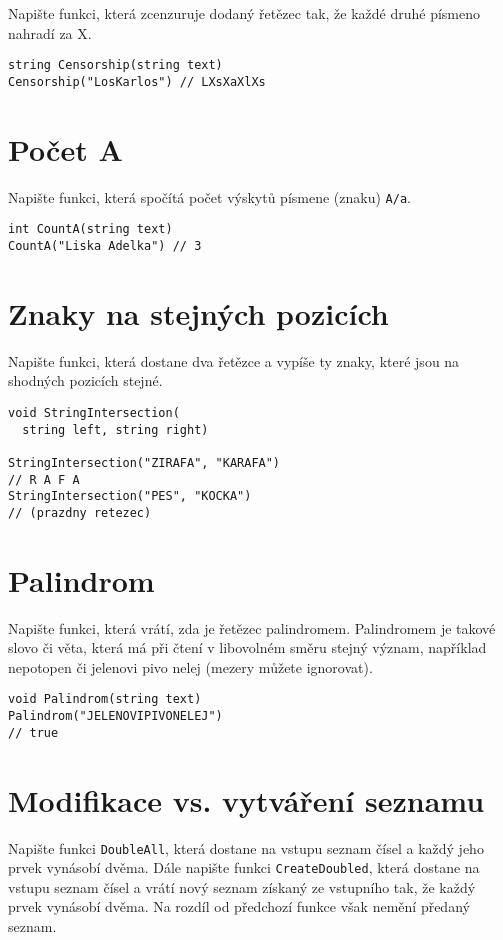 \documentclass[12pt,a4paper]{article}
\begin{document}
\begin{multicols}{2}
Napište funkci, která zcenzuruje dodaný řetězec tak, že každé druhé písmeno nahradí za X.

\begin{verbatim}
string Censorship(string text)
Censorship("LosKarlos") // LXsXaXlXs
\end{verbatim}

\section{Počet A}

Napište funkci, která spočítá počet výskytů písmene (znaku) \texttt{A/a}.

\begin{verbatim}
int CountA(string text)
CountA("Liska Adelka") // 3
\end{verbatim}

\section{Znaky na stejných pozicích}

Napište funkci, která dostane dva řetězce a vypíše ty znaky, které jsou na
shodných pozicích stejné.

\begin{verbatim}
void StringIntersection(
  string left, string right)

StringIntersection("ZIRAFA", "KARAFA")
// R A F A
StringIntersection("PES", "KOCKA")
// (prazdny retezec)
\end{verbatim}

\section{Palindrom}

Napište funkci, která vrátí, zda je řetězec palindromem. Palindromem je takové
slovo či věta, která má při čtení v libovolném směru stejný význam, například
nepotopen či jelenovi pivo nelej (mezery můžete ignorovat).

\begin{verbatim}
void Palindrom(string text)
Palindrom("JELENOVIPIVONELEJ")
// true
\end{verbatim}

\section{Modifikace vs. vytváření seznamu}

Napište funkci \texttt{DoubleAll}, která dostane na vstupu seznam čísel a
každý jeho prvek vynásobí dvěma. Dále napište funkci \texttt{CreateDoubled},
která dostane na vstupu seznam čísel a vrátí nový seznam získaný ze vstupního
tak, že každý prvek vynásobí dvěma. Na rozdíl od předchozí funkce však nemění
předaný seznam.

\end{multicols}
\end{document}

